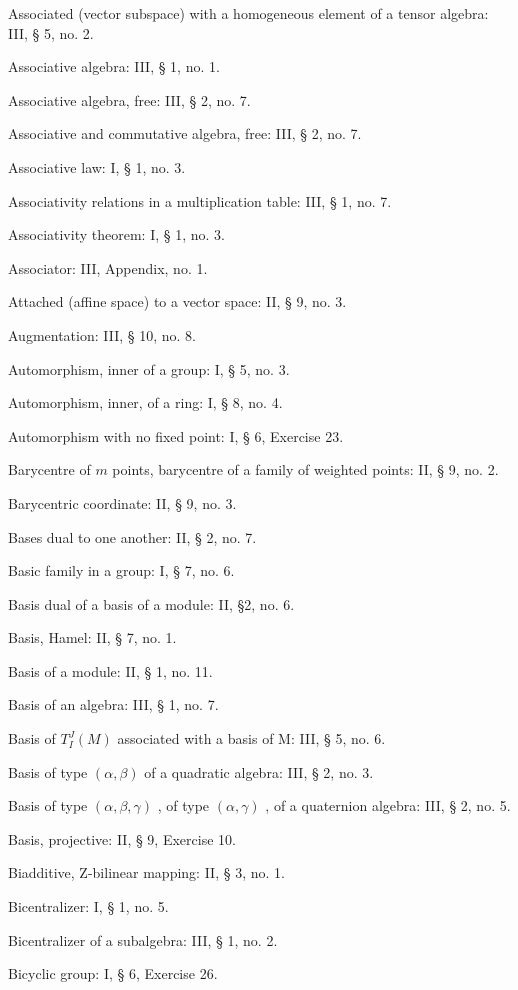 Associated (vector subspace) with a homogeneous element of a tensor algebra: III, § 5, no. 2.

Associative algebra: III, § 1, no. 1.

Associative algebra, free: III, § 2, no. 7.

Associative and commutative algebra, free: III, § 2, no. 7.

Associative law: I, § 1, no. 3.

Associativity relations in a multiplication table: III, § 1, no. 7.

Associativity theorem: I, § 1, no. 3.

Associator: III, Appendix, no. 1.

Attached (affine space) to a vector space: II, § 9, no. 3.

Augmentation: III, § 10, no. 8.

Automorphism, inner of a group: I, § 5, no. 3.

Automorphism, inner, of a ring: I, § 8, no. 4.

Automorphism with no fixed point: I, § 6, Exercise 23.

Barycentre of \(m\) points, barycentre of a family of weighted points: II, § 9, no. 2.

Barycentric coordinate: II, § 9, no. 3.

Bases dual to one another: II, § 2, no. 7.

Basic family in a group: I, § 7, no. 6.

Basis dual of a basis of a module: II, §2, no. 6.

Basis, Hamel: II, § 7, no. 1.

Basis of a module: II, § 1, no. 11.

Basis of an algebra: III, § 1, no. 7.

Basis of \(T_{I}^{J}(M)\) associated with a basis of M: III, § 5, no. 6.

Basis of type \((\alpha, \beta)\) of a quadratic algebra: III, § 2, no. 3.

Basis of type \((\alpha, \beta, \gamma)\) , of type \((\alpha, \gamma)\) , of a quaternion algebra: III, § 2, no. 5.

Basis, projective: II, § 9, Exercise 10.

Biadditive, Z-bilinear mapping: II, § 3, no. 1.

Bicentralizer: I, § 1, no. 5.

Bicentralizer of a subalgebra: III, § 1, no. 2.

Bicyclic group: I, § 6, Exercise 26.

